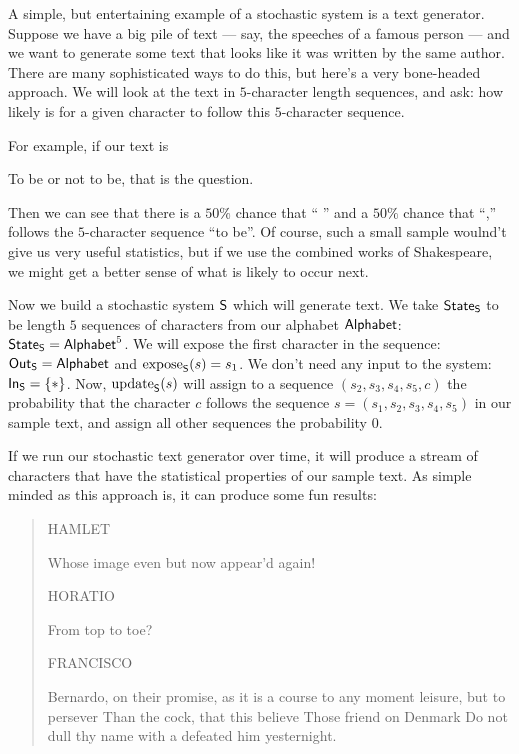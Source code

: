 \documentclass[DynamicalBook]{subfiles}
\begin{document}
\begin{example}\label{ex.markov_text_generator}
  A simple, but entertaining example of a stochastic system is a text generator.
  Suppose we have a big pile of text --- say, the speeches of a famous person
  --- and we want to generate some text that looks like it was written by the
  same author. There are many sophisticated ways to do this, but here's a very
  bone-headed approach. We will look at the text in $5$-character length
  sequences, and ask: how likely is for a given character to follow this
  $5$-character sequence.

  For example, if our text is
  \begin{center}
To be or not to be, that is the question.
  \end{center}
Then we can see that there is a $50\%$ chance that `` '' and a $50\%$ chance
that ``,'' follows the $5$-character sequence ``to be''. Of course, such a small
sample woulnd't give us very useful statistics, but if we use the combined works
of Shakespeare, we might get a better sense of what is likely to occur next.

Now we build a stochastic system $\mathsf{S}$ which will generate text. We take
$\mathsf{State}_{\mathsf{S}}$ to be length $5$ sequences of characters from our alphabet
$\mathsf{Alphabet}$: $\mathsf{State}_{\mathsf{S}} = \mathsf{Alphabet}^5$. We will
expose the first character in the sequence: $\mathsf{Out}_{\mathsf{S}} = \mathsf{Alphabet}$ and $\mathrm{expose}_{\mathsf{S}}(s) = s_1$. We don't need any
input to the system: $\mathsf{In}_{\mathsf{S}} = \{\ast\}$. Now, $\mathrm{update}_{\mathsf{S}}(s)$ will assign to a
sequence $(s_2, s_3, s_4, s_5, c)$ the probability that the character $c$
follows the sequence $s = (s_1, s_2, s_3, s_4, s_5)$ in our sample text, and
assign all other sequences the probability $0$.

If we run our stochastic text generator over time, it will produce a stream of
characters that have the statistical properties of our sample text. As simple
minded as this approach is, it can produce some fun results:
\begin{quote}
  HAMLET

    Whose image even but now appear'd again!

HORATIO

    From top to toe?

FRANCISCO

    Bernardo, on their promise, as it is a course to any moment leisure, but to persever
    Than the cock, that this believe
    Those friend on Denmark
    Do not dull thy name with a defeated him yesternight.
\end{quote}


\end{example}
\end{document}
